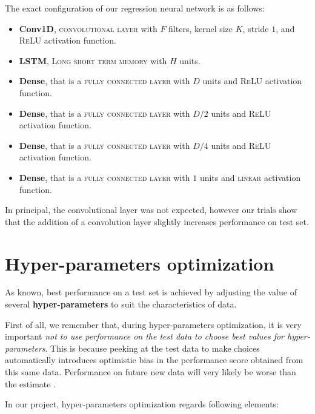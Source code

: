 \documentclass[sigconf]{acmart}
\begin{document}
The exact configuration of our regression neural network is as follows:

\begin{itemize}
\item \textbf{Conv1D}, \textsc{convolutional layer} with $F$ filters, kernel size $K$, stride $1$, and \textsc{ReLU} activation function.

\item \textbf{LSTM}, \textsc{Long short term memory} with $H$ units.

\item \textbf{Dense}, that is a \textsc{fully connected layer} with $D$ units and \textsc{ReLU} activation function.

\item \textbf{Dense}, that is a \textsc{fully connected layer} with $D/2$ units and \textsc{ReLU} activation function.

\item \textbf{Dense}, that is a \textsc{fully connected layer} with $D/4$ units and \textsc{ReLU} activation function.

\item \textbf{Dense}, that is a \textsc{fully connected layer} with $1$ units and \textsc{linear} activation function.
\end{itemize}

In principal, the convolutional layer was not expected, however our trials show that the addition of a convolution layer
slightly increases performance on test set.

\section{Hyper-parameters optimization}

As known, best performance on a test set is achieved by adjusting the value of several \textbf{hyper-parameters} to suit the characteristics of data. 

First of all, we remember that, during hyper-parameters optimization, it is very important \textit{not to use performance on the test data to choose best values for hyper-parameters}. This is because peeking at the test data to make choices automatically introduces optimistic bias in the performance score obtained from this same data. Performance on future new data will very likely be worse than the estimate \cite{FalessiDataMining}.

In our project, hyper-parameters optimization regards following elements:
\end{document}
